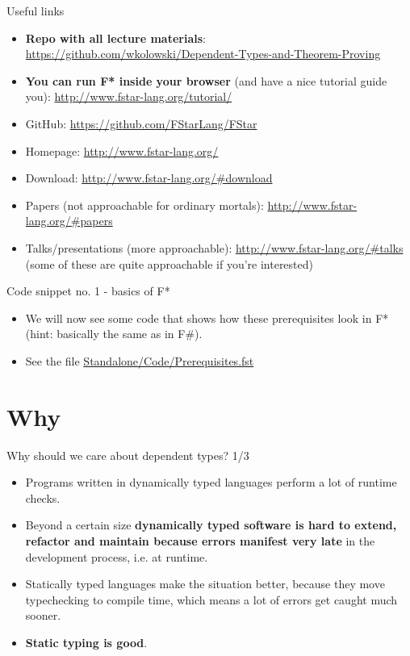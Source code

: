 \documentclass{beamer}
\begin{document}
\begin{frame}{Useful links}
\begin{itemize}
	\item \textbf{Repo with all lecture materials}: \url{https://github.com/wkolowski/Dependent-Types-and-Theorem-Proving}
	\item \textbf{You can run F* inside your browser} (and have a nice tutorial guide you): \url{http://www.fstar-lang.org/tutorial/}
	\item GitHub: \url{https://github.com/FStarLang/FStar}
	\item Homepage: \url{http://www.fstar-lang.org/}
	\item Download: \url{http://www.fstar-lang.org/\#download}
	\item Papers (not approachable for ordinary mortals): \url{http://www.fstar-lang.org/\#papers}
	\item Talks/presentations (more approachable): \url{http://www.fstar-lang.org/\#talks} (some of these are quite approachable if you're interested)  
\end{itemize}
\end{frame}

\begin{frame}{Code snippet no. 1 - basics of F*}
\begin{itemize}
	\item We will now see some code that shows how these prerequisites look in F* (hint: basically the same as in F\#).
	\item See the file \href{https://github.com/wkolowski/Dependent-Types-and-Theorem-Proving/blob/master/Standalone/Code/Prerequisites.fst}{Standalone/Code/Prerequisites.fst}
\end{itemize}
\end{frame}

\section{Why}

\begin{frame}{Why should we care about dependent types? 1/3}
\begin{itemize}
	\item Programs written in dynamically typed languages perform a lot of runtime checks.
	\item Beyond a certain size \textbf{dynamically typed software is hard to extend, refactor and maintain because errors manifest very late} in the development process, i.e. at runtime.
	\item Statically typed languages make the situation better, because they move typechecking to compile time, which means a lot of errors get caught much sooner.
	\item \textbf{Static typing is good}.
\end{itemize}
\end{frame}
\end{document}
